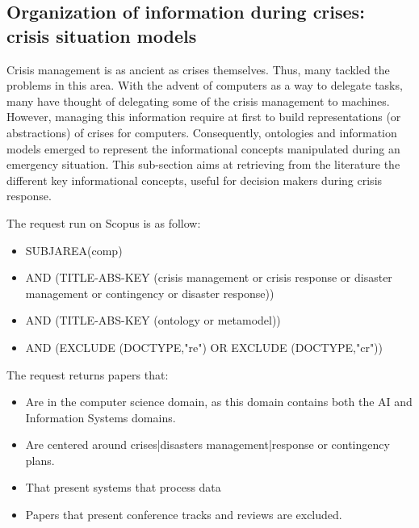 \subsection{Organization of information during crises: crisis situation models}
Crisis management is as ancient as crises themselves.
Thus, many tackled the problems in this area.
With the advent of computers as a way to delegate tasks, many have thought of delegating some of the crisis management to machines.
However, managing this information require at first to build representations (or abstractions) of crises for computers.
Consequently, ontologies and information models emerged to represent the informational concepts manipulated during an emergency situation.
This sub-section aims at retrieving from the literature the different key informational concepts, useful for decision makers during crisis response.

The request run on Scopus is as follow:
\begin{itemize}
    \item SUBJAREA(comp)
    \item AND (TITLE-ABS-KEY ({crisis management} or {crisis response} or {disaster management} or contingency or {disaster response}))
    \item AND (TITLE-ABS-KEY (ontology or metamodel))
    \item AND (EXCLUDE (DOCTYPE,"re") OR EXCLUDE (DOCTYPE,"cr"))
\end{itemize}

The request returns papers that:
\begin{itemize}
    \item Are in the computer science domain, as this domain contains both the AI and Information Systems domains.
    \item Are centered around crises|disasters management|response or contingency plans.
    \item That present systems that process data
    \item Papers that present conference tracks and reviews are excluded.
\end{itemize}

